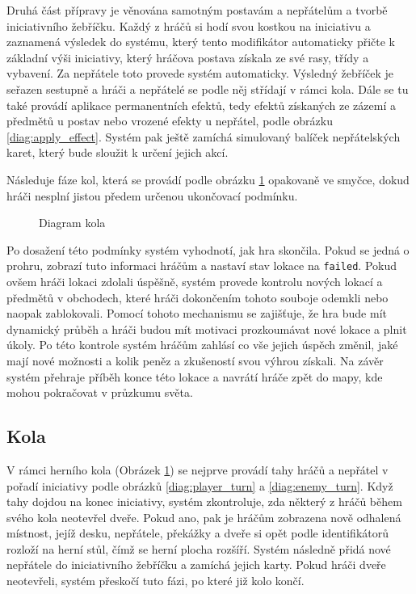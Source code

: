 Druhá část přípravy je věnována samotným postavám a nepřátelům a tvorbě iniciativního žebříčku. Každý z hráčů si hodí svou kostkou na iniciativu a zaznamená výsledek do systému, který tento modifikátor automaticky přičte k základní výši iniciativy, který hráčova postava získala ze své rasy, třídy a vybavení. Za nepřátele toto provede systém automaticky. Výsledný žebříček je seřazen sestupně a hráči a nepřátelé se podle něj střídají v rámci kola. Dále se tu také provádí aplikace permanentních efektů, tedy efektů získaných ze zázemí a předmětů u postav nebo vrozené efekty u nepřátel, podle obrázku \ref{diag:apply_effect}. Systém pak ještě zamíchá simulovaný balíček nepřátelských karet, který bude sloužit k určení jejich akcí.

Následuje fáze kol, která se provádí podle obrázku \ref{diag:round} opakovaně ve smyčce, dokud hráči nesplní jistou předem určenou ukončovací podmínku.

\begin{figure}[h]
    \centering
    \caption{Diagram kola}
    \label{diag:round}
\end{figure}

Po dosažení této podmínky systém vyhodnotí, jak hra skončila. Pokud se jedná o prohru, zobrazí tuto informaci hráčům a nastaví stav lokace na \texttt{failed}. Pokud ovšem hráči lokaci zdolali úspěšně, systém provede kontrolu nových lokací a předmětů v obchodech, které hráči dokončením tohoto souboje odemkli nebo naopak zablokovali. Pomocí tohoto mechanismu se zajišťuje, že hra bude mít dynamický průběh a hráči budou mít motivaci prozkoumávat nové lokace a plnit úkoly. Po této kontrole systém hráčům zahlásí co vše jejich úspěch změnil, jaké mají nové možnosti a kolik peněz a zkušeností svou výhrou získali. Na závěr systém přehraje příběh konce této lokace a navrátí hráče zpět do mapy, kde mohou pokračovat v průzkumu světa.


\subsection{Kola}
\label{subsec:design_rounds}

V rámci herního kola (Obrázek \ref{diag:round}) se nejprve provádí tahy hráčů a nepřátel v pořadí iniciativy podle obrázků \ref{diag:player_turn} a \ref{diag:enemy_turn}. Když tahy dojdou na konec iniciativy, systém zkontroluje, zda některý z hráčů během svého kola neotevřel dveře. Pokud ano, pak je hráčům zobrazena nově odhalená místnost, jejíž desku, nepřátele, překážky a dveře si opět podle identifikátorů rozloží na herní stůl, čímž se herní plocha rozšíří. Systém následně přidá nové nepřátele do iniciativního žebříčku a zamíchá jejich karty. Pokud hráči dveře neotevřeli, systém přeskočí tuto fázi, po které již kolo končí.


